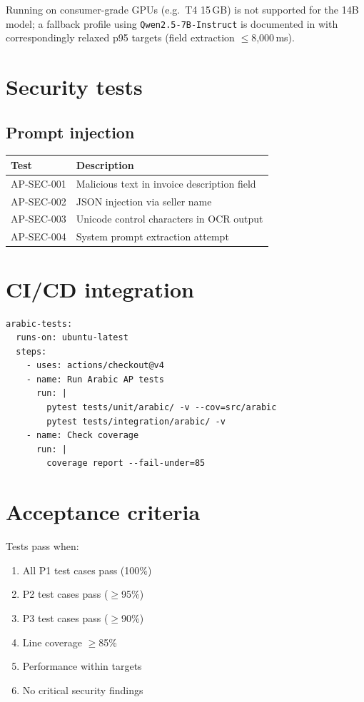 \noindent
Running on consumer-grade GPUs (e.g.\ T4 15\,GB) is not supported for
the 14B model; a fallback profile using
\texttt{Qwen2.5-7B-Instruct} is documented in
 with correspondingly
relaxed p95 targets (field extraction $\le$8,000\,ms).

\section{Security tests}

\subsection{Prompt injection}

\begin{tabularx}{\linewidth}{@{}l X@{}}
\toprule
\textbf{Test} & \textbf{Description} \\ \midrule
AP-SEC-001 & Malicious text in invoice description field \\
AP-SEC-002 & JSON injection via seller name \\
AP-SEC-003 & Unicode control characters in OCR output \\
AP-SEC-004 & System prompt extraction attempt \\
\bottomrule
\end{tabularx}

\section{CI/CD integration}

\begin{lstlisting}[basicstyle=\ttfamily\small,caption={GitHub Actions workflow excerpt.}]
arabic-tests:
  runs-on: ubuntu-latest
  steps:
    - uses: actions/checkout@v4
    - name: Run Arabic AP tests
      run: |
        pytest tests/unit/arabic/ -v --cov=src/arabic
        pytest tests/integration/arabic/ -v
    - name: Check coverage
      run: |
        coverage report --fail-under=85
\end{lstlisting}

\section{Acceptance criteria}

Tests pass when:
\begin{enumerate}
  \item All P1 test cases pass (100\%)
  \item P2 test cases pass ($\geq$95\%)
  \item P3 test cases pass ($\geq$90\%)
  \item Line coverage $\geq$85\%
  \item Performance within targets
  \item No critical security findings
\end{enumerate}